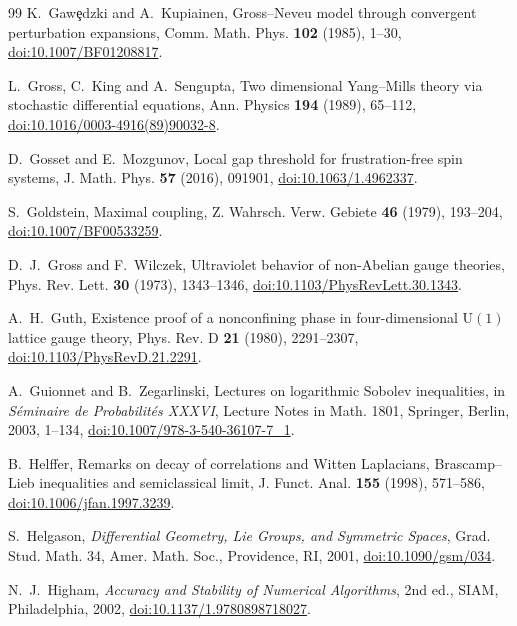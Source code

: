 \documentclass[aps,prd,twocolumn,superscriptaddress,nofootinbib,longbibliography,floatfix,amsmath,amssymb,10pt]{revtex4-2}
\theoremstyle{definition}
\theoremstyle{remark}
\newcommand{\U}{\mathrm{U}}
\begin{document}
\begin{thebibliography}{99}
K.~Gaw\c{e}dzki and A.~Kupiainen, Gross--Neveu model through convergent perturbation expansions, Comm. Math. Phys. \textbf{102} (1985), 1--30, \href{https://doi.org/10.1007/BF01208817}{doi:10.1007/BF01208817}.

L.~Gross, C.~King and A.~Sengupta, Two dimensional Yang--Mills theory via stochastic differential equations, Ann. Physics \textbf{194} (1989), 65--112, \href{https://doi.org/10.1016/0003-4916(89)90032-8}{doi:10.1016/0003-4916(89)90032-8}.

D.~Gosset and E.~Mozgunov, Local gap threshold for frustration-free spin systems, J. Math. Phys. \textbf{57} (2016), 091901, \href{https://doi.org/10.1063/1.4962337}{doi:10.1063/1.4962337}.

S.~Goldstein, Maximal coupling, Z. Wahrsch. Verw. Gebiete \textbf{46}
(1979), 193--204,
\href{https://doi.org/10.1007/BF00533259}{doi:10.1007/BF00533259}.

D.~J.~Gross and F.~Wilczek, Ultraviolet behavior of non-Abelian gauge
theories, Phys. Rev. Lett. \textbf{30} (1973), 1343--1346,
\href{https://doi.org/10.1103/PhysRevLett.30.1343}{doi:10.1103/PhysRevLett.30.1343}.

A.~H.~Guth, Existence proof of a nonconfining phase in four-dimensional $\U(1)$ lattice gauge theory, Phys. Rev. D \textbf{21} (1980), 2291--2307, \href{https://doi.org/10.1103/PhysRevD.21.2291}{doi:10.1103/PhysRevD.21.2291}.

A.~Guionnet and B.~Zegarlinski, Lectures on logarithmic Sobolev
inequalities, in \emph{S\'eminaire de Probabilit\'es XXXVI}, Lecture Notes in
Math. 1801, Springer, Berlin, 2003, 1--134,
\href{https://doi.org/10.1007/978-3-540-36107-7_1}{doi:10.1007/978-3-540-36107-7\_1}.

B.~Helffer, Remarks on decay of correlations and Witten Laplacians,
Brascamp--Lieb inequalities and semiclassical limit, J. Funct. Anal.
\textbf{155} (1998), 571--586,
\href{https://doi.org/10.1006/jfan.1997.3239}{doi:10.1006/jfan.1997.3239}.

S.~Helgason, \emph{Differential Geometry, Lie Groups, and Symmetric Spaces},
Grad. Stud. Math. 34, Amer. Math. Soc., Providence, RI, 2001,
\href{https://doi.org/10.1090/gsm/034}{doi:10.1090/gsm/034}.

N.~J.~Higham, \emph{Accuracy and Stability of Numerical Algorithms}, 2nd
ed., SIAM, Philadelphia, 2002,
\href{https://doi.org/10.1137/1.9780898718027}{doi:10.1137/1.9780898718027}.


\end{thebibliography}
\end{document}
